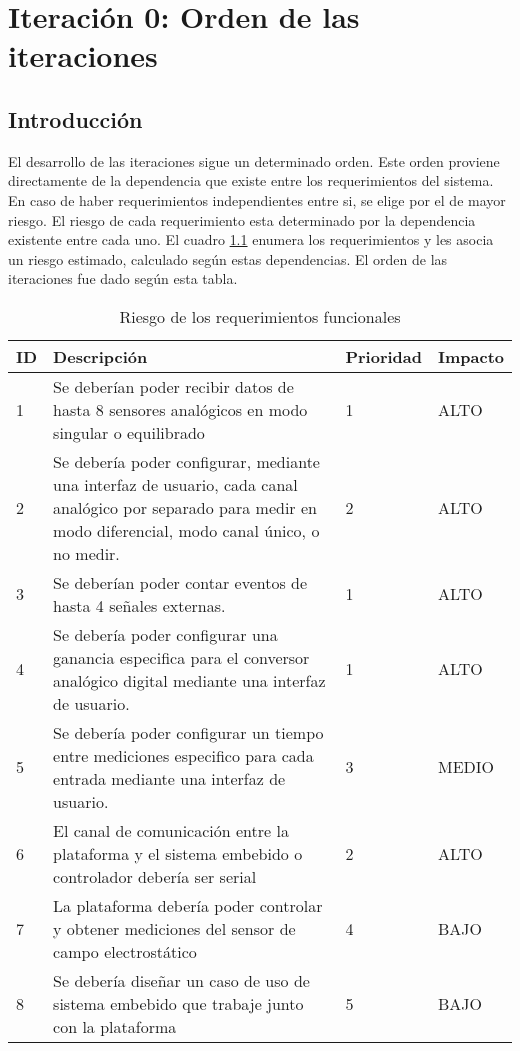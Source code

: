 \chapter{Iteración 0: Orden de las iteraciones} %
\label{cha:iteracion_0}

\section{Introducción} %
\label{it0:sec:introduccion}

El desarrollo de las iteraciones sigue un determinado orden. Este orden proviene directamente de la dependencia que existe entre los requerimientos del sistema. En caso de haber requerimientos independientes entre si, se elige por el de mayor riesgo. El riesgo de cada requerimiento esta determinado por la dependencia existente entre cada uno. El cuadro \ref{tab:riesgoderequerimientos} enumera los requerimientos y les asocia un riesgo estimado, calculado según estas dependencias. El orden de las iteraciones fue dado según esta tabla.

\begin{table}[ht]
\centering
\caption{Riesgo de los requerimientos funcionales}
\label{tab:riesgoderequerimientos}
\begin{center}
\centering
\begin{tabular}{|p{0.3cm}|p{6cm}|p{1.5cm}|p{1.5cm}|}
\hline
\cellcolor[HTML]{68CBD0}ID & \cellcolor[HTML]{68CBD0}Descripción & \cellcolor[HTML]{68CBD0}Prioridad & \cellcolor[HTML]{68CBD0}Impacto  \\
\hline
1 &  Se deberían poder recibir datos de hasta 8 sensores analógicos en modo singular o equilibrado & 1 & ALTO  \\
\hline
2 &  Se debería poder configurar, mediante una interfaz de usuario, cada canal analógico por separado para medir en modo diferencial, modo canal único, o no medir. & 2 & ALTO  \\
\hline
3 &  Se deberían poder contar eventos de hasta 4 señales externas. & 1 & ALTO  \\
\hline
4 &   Se debería poder configurar una ganancia especifica para el conversor analógico digital mediante una interfaz de usuario. & 1 & ALTO  \\
\hline
5 &  Se debería poder configurar un tiempo entre mediciones especifico para cada entrada mediante una interfaz de usuario. & 3 & MEDIO \\
\hline
6 &   El canal de comunicación entre la plataforma y el sistema embebido o controlador debería ser serial  & 2 & ALTO \\
\hline
7 &  La plataforma debería poder controlar y obtener mediciones del sensor de campo electrostático & 4 & BAJO  \\
\hline
8 &  Se debería diseñar un caso de uso de sistema embebido que trabaje junto con la plataforma & 5 & BAJO  \\
\hline
\end{tabular}
\end{center}
\end{table}

